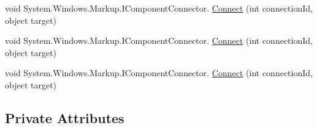 \begin{DoxyCompactItemize}
void System.\+Windows.\+Markup.\+I\+Component\+Connector. \mbox{\hyperlink{class_projekt1_1_1_main_window_ae7ef4e7422455818e8e3deda6cc75900}{Connect}} (int connection\+Id, object target)
\item 
void System.\+Windows.\+Markup.\+I\+Component\+Connector. \mbox{\hyperlink{class_projekt1_1_1_main_window_ae7ef4e7422455818e8e3deda6cc75900}{Connect}} (int connection\+Id, object target)
\item 
void System.\+Windows.\+Markup.\+I\+Component\+Connector. \mbox{\hyperlink{class_projekt1_1_1_main_window_ae7ef4e7422455818e8e3deda6cc75900}{Connect}} (int connection\+Id, object target)
\end{DoxyCompactItemize}
\subsection*{Private Attributes}

